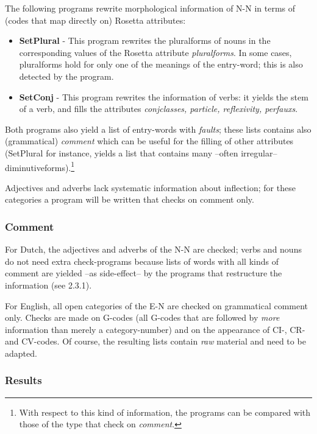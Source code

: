 The following programs rewrite morphological information of N-N
in terms of (codes that map directly on) Rosetta attributes:
 
\begin{itemize}
  \item {\bf SetPlural} - This program rewrites the pluralforms of 
        nouns 
        in the corresponding values of the Rosetta attribute {\em pluralforms}.
        In some cases, pluralforms
        hold for only one of the meanings of the entry-word; this is also 
        detected by the program. 
  \item {\bf SetConj} - This program rewrites the information of verbs: it 
        yields the stem of a verb, and fills the attributes {\em conjclasses, 
        particle, reflexivity, perfauxs}. 
\end{itemize}
 
Both programs also yield a list of entry-words with {\em faults};
these lists contains also (grammatical) {\em comment}
which can be useful for the filling of other attributes (SetPlural
for instance, yields a list that contains many --often irregular--
diminutiveforms).\footnote{With respect to 
this kind of information, the programs can be compared with those of the 
type that check on {\em comment}.}
 
Adjectives and adverbs lack systematic information about inflection; for these 
categories a program will be written that checks on comment only.
 
\subsubsection{Comment}
 
For Dutch, the adjectives and adverbs of the N-N are checked; verbs and 
nouns do not need extra check-programs because lists of words with all kinds of 
comment are yielded --as side-effect-- by the programs that restructure the 
information (see 2.3.1).
 
For English, all open categories of the E-N are checked on grammatical 
comment only. Checks are made on G-codes (all G-codes that are followed by 
{\em more} information than merely a category-number) and on the appearance of 
CI-, CR- and CV-codes. Of course, the resulting lists contain {\em raw} 
material and need to be adapted.
 
\subsubsection{Results}
 
